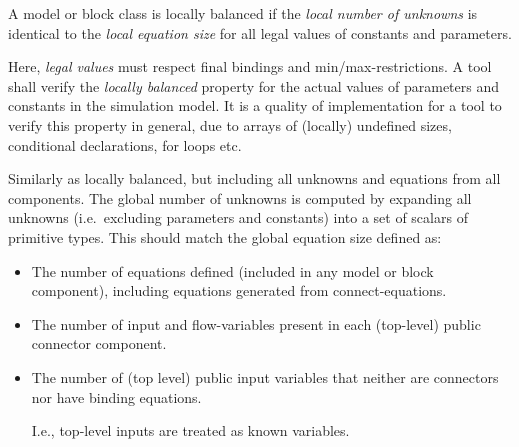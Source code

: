 \begin{definition}
A model or block class is locally balanced if the \emph{local number of unknowns} is identical to the \emph{local equation size} for all legal values of constants and parameters.
\end{definition}

\begin{nonnormative}
Here, \emph{legal values} must respect final bindings and min/max-restrictions.  A tool shall verify the \emph{locally balanced} property for the actual
values of parameters and constants in the simulation model.  It is a quality of implementation for a tool to verify this property in general, due to
arrays of (locally) undefined sizes, conditional declarations, for loops etc.
\end{nonnormative}

\begin{definition}
Similarly as locally balanced, but including all unknowns and equations
from all components. The global number of unknowns is computed by
expanding all unknowns (i.e.\ excluding parameters and constants) into a
set of scalars of primitive types. This should match the global equation
size defined as:
\begin{itemize}
\item
  The number of equations defined (included in any model or block
  component), including equations generated from connect-equations.
\item
  The number of input and flow-variables present in each (top-level)
  public connector component.
\item
  The number of (top level) public input variables that neither are connectors nor have binding equations.
  \begin{nonnormative}
  I.e., top-level inputs are treated as known variables.
  \end{nonnormative}
\end{itemize}
\end{definition}

